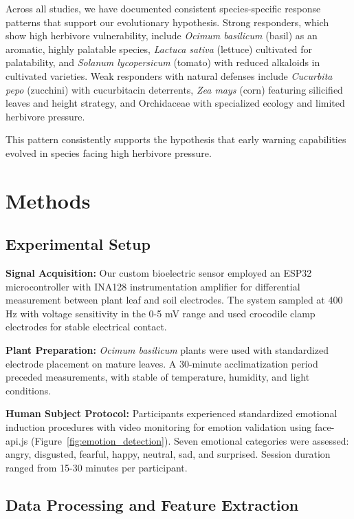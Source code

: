 \documentclass{article}
\begin{document}
Across all studies, we have documented consistent species-specific response patterns that support our evolutionary hypothesis. Strong responders, which show high herbivore vulnerability, include \textit{Ocimum basilicum} (basil) as an aromatic, highly palatable species, \textit{Lactuca sativa} (lettuce) cultivated for palatability, and \textit{Solanum lycopersicum} (tomato) with reduced alkaloids in cultivated varieties. Weak responders with natural defenses include \textit{Cucurbita pepo} (zucchini) with cucurbitacin deterrents, \textit{Zea mays} (corn) featuring silicified leaves and height strategy, and Orchidaceae with specialized ecology and limited herbivore pressure.

This pattern consistently supports the hypothesis that early warning capabilities evolved in species facing high herbivore pressure.

\section{Methods}

\subsection{Experimental Setup}

\textbf{Signal Acquisition:} Our custom bioelectric sensor employed an ESP32 microcontroller with INA128 instrumentation amplifier for differential measurement between plant leaf and soil electrodes. The system sampled at 400 Hz with voltage sensitivity in the 0-5 mV range and used crocodile clamp electrodes for stable electrical contact.

\textbf{Plant Preparation:} \textit{Ocimum basilicum} plants were used with standardized electrode placement on mature leaves. A 30-minute acclimatization period preceded measurements, with stable of temperature, humidity, and light conditions.

\textbf{Human Subject Protocol:} Participants experienced standardized emotional induction procedures with video monitoring for emotion validation using face-api.js (Figure~\ref{fig:emotion_detection}). Seven emotional categories were assessed: angry, disgusted, fearful, happy, neutral, sad, and surprised. Session duration ranged from 15-30 minutes per participant.

\subsection{Data Processing and Feature Extraction}
\end{document}
